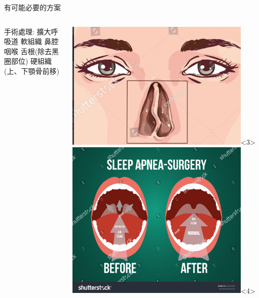 \documentclass[aspectratio=169]{beamer}
\begin{document}
\begin{frame}{有可能必要的方案}
    \begin{columns}
    
    \begin{outline}
     手術處理: 擴大呼吸道
         軟組織
             \huge{鼻腔}
             \huge{咽喉}
             \huge{舌根(除去黑圈部位)}
         硬組織(上、下顎骨前移)
    \end{outline}
    
    \centering
    \includegraphics[width=0.9\textwidth]{nasal_septum.jpg}<3>
    \includegraphics[width=0.9\textwidth]{stock-vector-vector-illustration-of-surgery-for-obstructive-sleep-apnea-before-and-after-result-625415732.jpg}<4>

\end{columns}
\end{frame}
\end{document}
